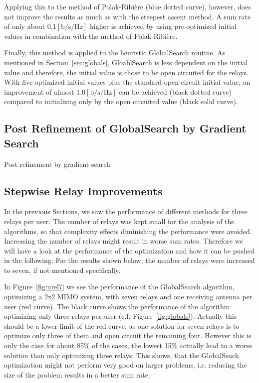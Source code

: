 Applying this to the method of Polak-Ribi\`{e}re (blue dotted curve), however, does not improve the results as much as with the steepest ascent method.
A sum rate of only about $0.1 \left[\text{b/s/Hz}\right]$ higher is achieved by using pre-optimized initial values in combination with the method of Polak-Ribi\`{e}re.

Finally, this method is applied to the heuristic GlobalSearch routine.
As mentioned in Section~\ref{sec:globals}, GloablSearch is less dependent on the initial value and therefore, the initial value is chose to be open circuited for the relays.
With five optimized initial values plus the standard open circuit initial value, an improvement of almost $1.0 \left[\text{b/s/Hz}\right]$ can be achieved (black dotted curve) compared to initializing only by the open circuited value (black solid curve).


\subsection{Post Refinement of GlobalSearch by Gradient Search}
Post refinement by gradient search

\subsection{Stepwise Relay Improvements}
In the previous Sections, we saw the performance of different methods for three relays per user.
The number of relays was kept small for the analysis of the algorithms, so that complexity effects diminishing the performance were avoided.
Increasing the number of relays might result in worse sum rates.
Therefore we will have a look at the performance of the optimization and how it can be pushed in the following.
For the results shown below, the number of relays were increased to seven, if not mentioned specifically.

In Figure~\ref{fig:nrel7} we see the performance of the GlobalSearch algorithm, optimizing a 2x2 MIMO system, with seven relays and one receiving antenna per user (red curve).
The black curve shows the performance of the algorithm optimizing only three relays per user (c.f. Figure~\ref{fig:globals}).
Actually this should be a lower limit of the red curve, as one solution for seven relays is to optimize only three of them and open circuit the remaining four.
However this is only the case for about 85\% of the cases, the lowest 15\% actually lead to a worse solution than only optimizing three relays.
This shows, that the GlobalSeach optimization might not perform very good on larger problems, i.e. reducing the size of the problem results in a better sum rate.

